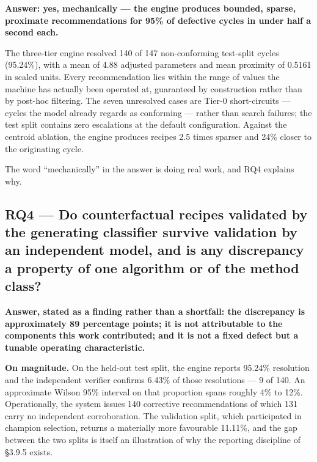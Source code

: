 \textbf{Answer: yes, mechanically --- the engine produces bounded, sparse, proximate recommendations for 95\% of defective cycles in under half a second each.}

The three-tier engine resolved 140 of 147 non-conforming test-split cycles (95.24\%), with a mean of 4.88 adjusted parameters and mean proximity of 0.5161 in scaled units. Every recommendation lies within the range of values the machine has actually been operated at, guaranteed by construction rather than by post-hoc filtering. The seven unresolved cases are Tier-0 short-circuits --- cycles the model already regards as conforming --- rather than search failures; the test split contains zero escalations at the default configuration. Against the centroid ablation, the engine produces recipes 2.5 times sparser and 24\% closer to the originating cycle.

The word ``mechanically'' in the answer is doing real work, and RQ4 explains why.

\hypertarget{rq4-do-counterfactual-recipes-validated-by-the-generating-classifier-survive-validation-by-an-independent-model-and-is-any-discrepancy-a-property-of-one-algorithm-or-of-the-method-class}{%
\subsection{RQ4 --- Do counterfactual recipes validated by the generating classifier survive validation by an independent model, and is any discrepancy a property of one algorithm or of the method class?}\label{rq4-do-counterfactual-recipes-validated-by-the-generating-classifier-survive-validation-by-an-independent-model-and-is-any-discrepancy-a-property-of-one-algorithm-or-of-the-method-class}}

\textbf{Answer, stated as a finding rather than a shortfall: the discrepancy is approximately 89 percentage points; it is not attributable to the components this work contributed; and it is not a fixed defect but a tunable operating characteristic.}

\textbf{On magnitude.} On the held-out test split, the engine reports 95.24\% resolution and the independent verifier confirms 6.43\% of those resolutions --- 9 of 140. An approximate Wilson 95\% interval on that proportion spans roughly 4\% to 12\%. Operationally, the system issues 140 corrective recommendations of which 131 carry no independent corroboration. The validation split, which participated in champion selection, returns a materially more favourable 11.11\%, and the gap between the two splits is itself an illustration of why the reporting discipline of §3.9.5 exists.

